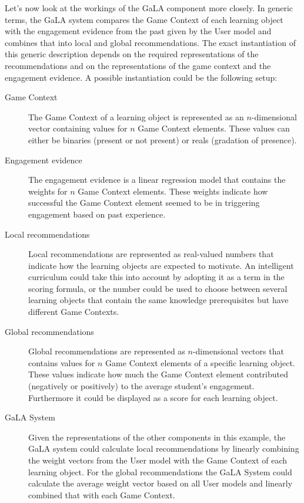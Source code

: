 \documentclass[11pt]{article}
\begin{document}
Let’s now look at the workings of the GaLA component more closely. In generic terms, the GaLA system compares the Game Context of each learning object with the engagement evidence from the past given by the User model and combines that into local and global recommendations. The exact instantiation of this generic description depends on the required representations of the recommendations and on the representations of the game context and the engagement evidence. A possible instantiation could be the following setup:
\begin{description}
\item[Game Context] The Game Context of a learning object is represented as an  $n$-dimensional vector containing values for $n$ Game Context elements. These values can either be binaries (present or not present) or reals (gradation of presence).
\item[Engagement evidence] The engagement evidence is a linear regression model that contains the weights for $n$ Game Context elements. These weights indicate how successful the Game Context element seemed to be in triggering engagement based on past experience.
\item[Local recommendations]  Local recommendations are represented as real-valued numbers that indicate how the learning objects are expected to motivate. An intelligent curriculum could take this into account by adopting it as a term in the scoring formula, or the number could be used to choose between several learning objects that contain the same knowledge prerequisites but have different Game Contexts.
\item[Global recommendations] Global recommendations are represented as $n$-dimensional vectors that contains values for $n$ Game Context elements of a specific learning object. These values indicate how much the Game Context element contributed (negatively or positively) to the average student’s engagement. Furthermore it could be displayed as a score for each learning object.
\item[GaLA System] Given the representations of the other components in this example, the GaLA system could calculate local recommendations by linearly combining the weight vectors from the User model with the Game Context of each learning object. For the global recommendations the GaLA System could calculate the average weight vector based on all User models and linearly combined that with each Game Context.
\end{description}
\end{document}
